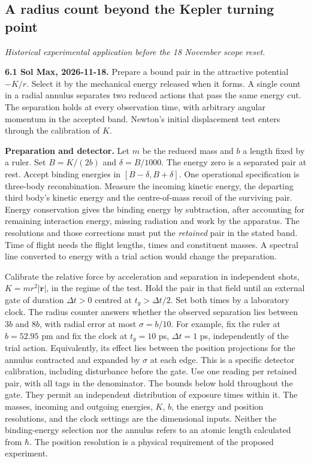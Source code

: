 \documentclass[11pt,a4paper]{article}
\begin{document}
\subsection{A radius count beyond the Kepler turning
point}\label{a-radius-count-beyond-the-kepler-turning-point}

\emph{Historical experimental application before the 18 November scope
reset.}

\textbf{6.1 Sol Max, 2026-11-18.} Prepare a bound pair in the attractive
potential \(-K/r\). Select it by the mechanical energy released when it
forms. A single count in a radial annulus separates two reduced actions
that pass the same energy cut. The separation holds at every observation
time, with arbitrary angular momentum in the accepted band. Newton's
initial displacement test enters through the calibration of \(K\).

\textbf{Preparation and detector.} Let \(m\) be the reduced mass and
\(b\) a length fixed by a ruler. Set \(B=K/(2b)\) and \(\delta=B/1000\).
The energy zero is a separated pair at rest. Accept binding energies in
\([B-\delta,B+\delta]\). One operational specification is three-body
recombination. Measure the incoming kinetic energy, the departing third
body's kinetic energy and the centre-of-mass recoil of the surviving
pair. Energy conservation gives the binding energy by subtraction, after
accounting for remaining interaction energy, missing radiation and work
by the apparatus. The resolutions and those corrections must put the
\emph{retained} pair in the stated band. Time of flight needs the flight
lengths, times and constituent masses. A spectral line converted to
energy with a trial action would change the preparation.

Calibrate the relative force by acceleration and separation in
independent shots, \(K=mr^2|{\ddot{\boldsymbol r}}|\), in the regime of
the test. Hold the pair in that field until an external gate of duration
\(\Delta t>0\) centred at \(t_g>\Delta t/2\). Set both times by a
laboratory clock. The radius counter answers whether the observed
separation lies between \(3b\) and \(8b\), with radial error at most
\(\sigma=b/10\). For example, fix the ruler at \(b=52.95\) pm and fix
the clock at \(t_g=10\) ps, \(\Delta t=1\) ps, independently of the
trial action. Equivalently, its effect lies between the position
projections for the annulus contracted and expanded by \(\sigma\) at
each edge. This is a specific detector calibration, including
disturbance before the gate. Use one reading per retained pair, with all
tags in the denominator. The bounds below hold throughout the gate. They
permit an independent distribution of exposure times within it. The
masses, incoming and outgoing energies, \(K\), \(b\), the energy and
position resolutions, and the clock settings are the dimensional inputs.
Neither the binding-energy selection nor the annulus refers to an atomic
length calculated from \(\hbar\). The position resolution is a physical
requirement of the proposed experiment.
\end{document}
